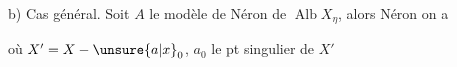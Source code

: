 b) Cas général. Soit $A$ le modèle de Néron de $\operatorname{Alb} X_{\eta}$, alors  Néron on a


où  $X'=X-\unsure{a|x}_0$, $a_0$ le pt singulier de $X'$
